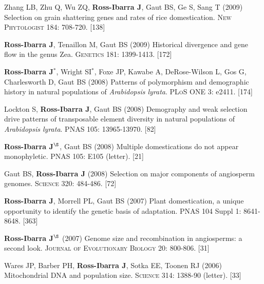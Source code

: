 \documentclass[letterpaper,10pt]{article}
\begin{document}
\begin{etaremune}
\item Zhang LB, Zhu Q, Wu ZQ, {\bf Ross-Ibarra J}, Gaut BS, Ge S, Sang T (2009) Selection on grain shattering genes and rates of rice domestication.  \textsc{New Phytologist} 184: 708-720.
 [138]\\

\item {\bf Ross-Ibarra J}, Tenaillon M, Gaut BS (2009) Historical divergence and gene flow in the genus Zea.  \textsc{Genetics} 181: 1399-1413.
 [172]\\


\item {\bf Ross-Ibarra J}$^*$, Wright SI$^*$, Foxe JP, Kawabe A, DeRose-Wilson L, Gos G, Charlesworth D, Gaut BS (2008) Patterns of polymorphism and demographic history in natural populations of \emph{Arabidopsis lyrata}.  \textsc{PLoS ONE} 3: e2411.
 [174]\\


\item Lockton S, {\bf Ross-Ibarra J}, Gaut BS (2008) Demography and weak selection drive patterns of transposable element diversity in natural populations of \emph{Arabidopsis lyrata}. PNAS 105: 13965-13970.
 [82]\\


\item {\bf Ross-Ibarra J}$^\S$, Gaut BS (2008) Multiple domestications do not appear monophyletic. PNAS 105: E105 (letter).
 [21]\\


\item Gaut BS, {\bf Ross-Ibarra J} (2008) Selection on major components of angiosperm genomes.  \textsc{Science} 320: 484-486.
 [72]\\


\item {\bf Ross-Ibarra J}, Morrell PL, Gaut BS (2007) Plant domestication, a unique opportunity to identify the genetic basis of adaptation. PNAS 104 Suppl 1: 8641-8648.
 [363]\\


\item {\bf Ross-Ibarra J}$^\S$ (2007) Genome size and recombination in angiosperms: a second look.  \textsc{Journal of Evolutionary Biology} 20: 800-806.
 [31]\\


\item Wares JP, Barber PH, {\bf Ross-Ibarra J}, Sotka EE, Toonen RJ (2006) Mitochondrial DNA and population size.  \textsc{Science} 314: 1388-90 (letter).
 [33]\\



\end{etaremune}
\end{document}
